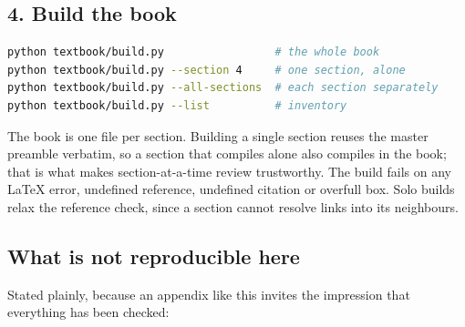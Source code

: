 \subsection*{4. Build the book}

\begin{lstlisting}[language=bash,style=lean,morekeywords={python}]
python textbook/build.py                 # the whole book
python textbook/build.py --section 4     # one section, alone
python textbook/build.py --all-sections  # each section separately
python textbook/build.py --list          # inventory
\end{lstlisting}

The book is one file per section. Building a single section reuses the master
preamble verbatim, so a section that compiles alone also compiles in the book;
that is what makes section-at-a-time review trustworthy. The build fails on any
LaTeX error, undefined reference, undefined citation or overfull box. Solo builds
relax the reference check, since a section cannot resolve links into its
neighbours.

\subsection*{What is not reproducible here}

Stated plainly, because an appendix like this invites the impression that
everything has been checked:

